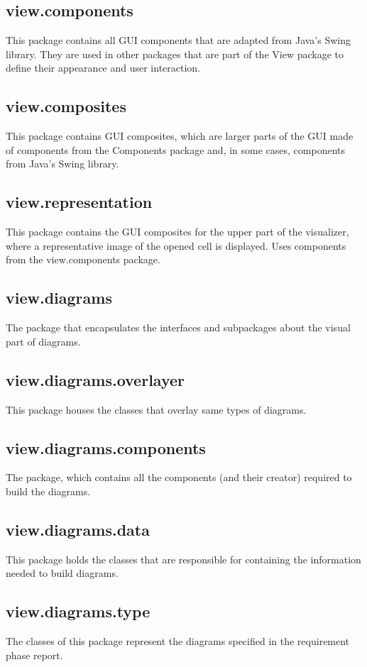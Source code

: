 \documentclass[10pt,a4paper]{report}
\begin{document}
    \subsection{view.components}
    This package contains all GUI components that are adapted from Java's Swing library. They are used in other packages that are part of the View package to define their appearance and user interaction.
    \subsection{view.composites}
    This package contains GUI composites, which are larger parts of the GUI made of components from the Components package and, in some cases, components from Java's Swing library.
     \subsection{view.representation}
    This package contains the GUI composites for the upper part of the visualizer, where a representative image of the opened cell is displayed. Uses components from the view.components package.
    \subsection{view.diagrams}
    The package that encapsulates the interfaces and subpackages about the visual part of diagrams.
    \subsection{view.diagrams.overlayer}
    This package houses the classes that overlay same types of diagrams.
    \subsection{view.diagrams.components}
    The package, which contains all the components (and their creator) required to build the diagrams.
    \subsection{view.diagrams.data}
    This package holds the classes that are responsible for containing the information needed to build diagrams.
    \subsection{view.diagrams.type}
    The classes of this package represent the diagrams specified in the requirement phase report.
\end{document}
